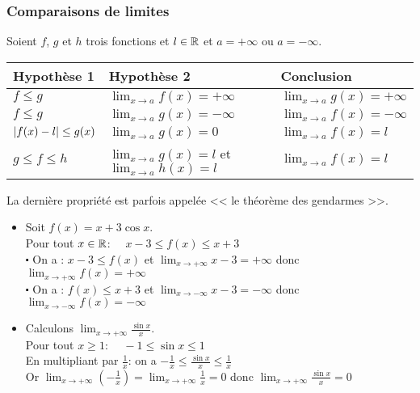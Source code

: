  \subsubsection*{Comparaisons de limites}

Soient $f $, $g$ et $h$ trois fonctions et $ l\in\mathbb{R}$ et  $ a= +\infty $ ou $ a=-\infty $.

\medskip
\begin{tabularx}{\textwidth}{|X|X|X|}
\hline
\textbf{ Hypothèse 1}  & \textbf{Hypothèse 2} & \textbf{ Conclusion }\\
\hline
$ f\leq g $  & $ \displaystyle \lim_{x \to a}f(x)=+\infty $ & $\displaystyle \lim_{x \to a}g(x)=+\infty $ \\
 \hline
 $ f\leq g $  & $\displaystyle \lim_{x \to a}g(x)=-\infty $ & $ \displaystyle \lim_{x \to a}f(x)=-\infty $    \\
\hline
$ \left\lvert f(x)-l  \right\rvert\leq g(x) $ & $\displaystyle \lim_{x \to a}g(x)=0$ & $ \displaystyle \lim_{x \to a}f(x)=l  $ \\
\hline
$ g \leq f \leq h $ & $ \displaystyle \lim_{x \to a}g(x)=l $ et $ \displaystyle \lim_{x \to a}h(x)=l $ & $ \displaystyle \lim_{x \to a}f(x)=l $    \\
\hline
\end{tabularx}


\begin{remark}
La dernière propriété est parfois appelée << le théorème des gendarmes >>.
 \end{remark}

\begin{example}
\begin{itemize}
\item  Soit $ f(x)= x+ 3\cos x $.\\
Pour tout $x\in\mathbb{R}$:  $\quad x-3\leq f(x)\leq x+3 $ \\
$ \centerdot $  On a : $ x-3\leq f(x)$ et $\displaystyle \lim_{x \to +\infty}x-3=+\infty  $ donc $ \displaystyle \lim_{x \to +\infty}f(x)=+\infty $\\
$ \centerdot $ On a :  $  f(x)\leq x+3$ et $\displaystyle \lim_{x \to -\infty}x-3=-\infty  $ donc $ \displaystyle \lim_{x \to -\infty}f(x)=-\infty $ \\

\item  Calculons $\displaystyle\lim_{x \to +\infty}\frac{\sin x}{x} $.\\

Pour tout $ x\geq 1 $: $\quad  -1\leq\sin x \leq 1 $ \\
En multipliant par $ \frac{1}{x} $: on a $ -\frac{1}{x}\leq \frac{\sin x}{x} \leq\frac{1}{x} $\\
Or $\displaystyle\lim_{x \to +\infty}(-\frac{1}{x})= \displaystyle\lim_{x \to +\infty}\frac{1}{x}=0$ donc $\displaystyle\lim_{x \to +\infty}\frac{\sin x}{x}=0 $
\end{itemize}

\end{example}

